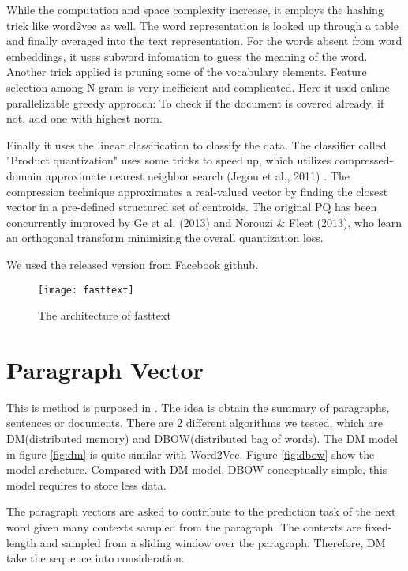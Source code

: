 While the computation and space complexity increase, it employs the hashing trick like word2vec as well. 
The word representation is looked up through a table and finally averaged into the text representation. 
For the words absent from word embeddings, it uses subword infomation\cite{bojanowski2016enriching} to guess the meaning of the word.
Another trick applied is pruning some of the vocabulary elements. Feature selection among N-gram is very inefficient and complicated.
Here it used online parallelizable greedy approach: To check if the document is covered already, if not, add one with highest norm.

Finally it uses the linear classification to classify the data. The classifier called "Product quantization" uses some tricks to speed up, which utilizes compressed-domain approximate nearest neighbor search (Jegou et al., 2011) \cite{jegou2011searching}.
The compression technique approximates a real-valued vector by finding the closest vector in a pre-defined structured set of centroids.
The original PQ has been concurrently improved by Ge et al. (2013)\cite{ge2013optimized} and Norouzi \& Fleet (2013), who learn an orthogonal transform minimizing the overall quantization loss.

We used the released version from Facebook github.


\begin{figure}[h]
    \centering
	\texttt{[image: fasttext]}
    \caption{The architecture of fasttext}
    \label{fig:fasttext}
\end{figure}


\section{Paragraph Vector}
	
This is method is purposed in \cite{PVDB}. The idea is obtain the summary of paragraphs, sentences or documents. 
There are 2 different algorithms we tested, which are DM(distributed memory) and DBOW(distributed bag of words). 
The DM model in figure \ref{fig:dm} is quite similar with Word2Vec.
Figure \ref{fig:dbow} show the model archeture. Compared with DM model, DBOW conceptually simple, this model requires to store less data. 

The paragraph vectors are asked to contribute to the prediction task of the next word given many contexts sampled from the paragraph.
The contexts are fixed-length and sampled from a sliding window over the paragraph. Therefore, DM take the sequence into consideration.

